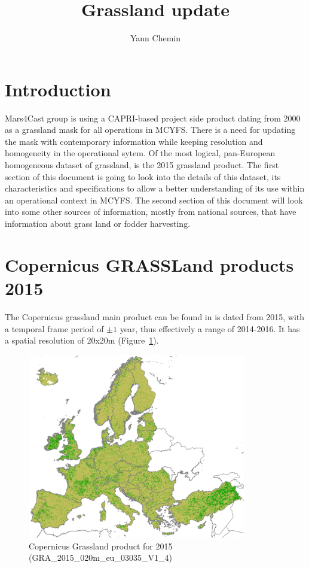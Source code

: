 \documentclass[a4paper,11.5pt,onecolumn]{article}
\begin{document}
\bigskip
\bigskip
\title{Grassland update}
\author{Yann Chemin}
\maketitle
\bigskip
\bigskip
\section{Introduction}
Mars4Cast group is using a CAPRI-based project side product dating from 2000 as a grassland mask for all operations in MCYFS. There is a need for updating the mask with contemporary information while keeping resolution and homogeneity in the operational sytem. Of the most logical, pan-European homogeneous dataset of grassland, is the 2015 grassland product. The first section of this document is going to look into the details of this dataset, its characteristics and specifications to allow a better understanding of its use within an operational context in MCYFS. The second section of this document will look into some other sources of information, mostly from national sources, that have information about grass land or fodder harvesting.

\section{Copernicus GRASSLand products 2015}

The Copernicus grassland main product can be found in \citep{grassland2015} is dated from 2015, with a temporal frame period of $\pm 1$ year, thus effectively a range of 2014-2016. It has a spatial resolution of 20x20m (Figure~\ref{fig1}).

\begin{figure}[htbp]
\centering
\includegraphics[width=0.85\textwidth]{images/grassland2015.png}
\caption{Copernicus Grassland product for 2015 (GRA\_2015\_020m\_eu\_03035\_V1\_4)}
\label{fig1}
\end{figure}
\end{document}
